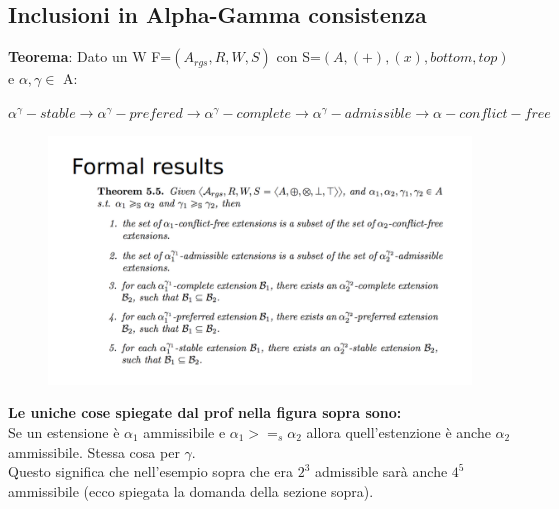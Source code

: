     \subsection{Inclusioni in Alpha-Gamma consistenza}
    \textbf{Teorema}: Dato un W F=$(A_{rgs }, R, W, S)$ con S=$(A, (+), (x), bottom, top)$ e $\alpha, \gamma \in$ A:
    \begin{center}
        $\alpha^\gamma-stable \rightarrow \alpha^\gamma-prefered \rightarrow \alpha^\gamma-complete \rightarrow \alpha^\gamma-admissible \rightarrow \alpha-conflict-free$
    \end{center}
    \begin{figure}[H]
        \centering
        \includegraphics[width=15cm, keepaspectratio]{img/Cap6/alpha-gamma2.png}
    \end{figure}
    \textbf{Le uniche cose spiegate dal prof nella figura sopra sono:}
    \\Se un estensione è $ \alpha_1$ ammissibile e $\alpha_1 >=_s \alpha_2$ allora quell'estenzione è anche $\alpha_2$ ammissibile. Stessa cosa per $\gamma$.
    \\Questo significa che nell'esempio sopra che era $2^3$ admissible sarà anche $4^5$ ammissibile (ecco spiegata la domanda della sezione sopra).

